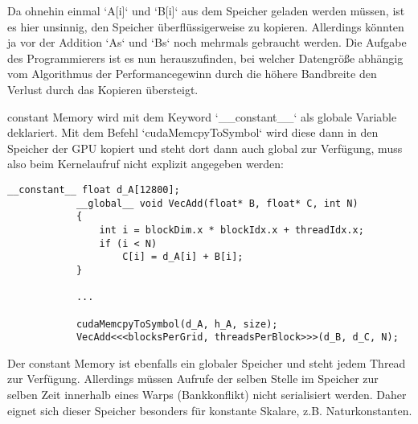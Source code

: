 		Da ohnehin einmal \li`A[i]` und \li`B[i]` aus dem Speicher geladen werden müssen, ist es hier unsinnig, den Speicher überflüssigerweise zu kopieren. Allerdings könnten ja vor der Addition \li`As` und \li`Bs` noch mehrmals gebraucht werden. Die Aufgabe des Programmierers ist es nun herauszufinden, bei welcher Datengröße abhängig vom Algorithmus der \Gls{Performance}gewinn durch die höhere Bandbreite den Verlust durch das Kopieren übersteigt.
		
		\Gls{constant Memory} wird mit dem Keyword \li`__constant__` als globale Variable deklariert. Mit dem Befehl \li`cudaMemcpyToSymbol` wird diese dann in den Speicher der GPU kopiert und steht dort dann auch global zur Verfügung, muss also beim \Gls{Kernel}aufruf nicht explizit angegeben werden:
		\begin{lstlisting}[caption=~Vektoraddition constant Memory]
			__constant__ float d_A[12800];
			__global__ void VecAdd(float* B, float* C, int N)
			{
    			int i = blockDim.x * blockIdx.x + threadIdx.x;
    			if (i < N)
        			C[i] = d_A[i] + B[i];
			}
			
			...
			
			cudaMemcpyToSymbol(d_A, h_A, size);
			VecAdd<<<blocksPerGrid, threadsPerBlock>>>(d_B, d_C, N);
		\end{lstlisting}
		
		Der \gls{constant Memory} ist ebenfalls ein globaler Speicher und steht jedem \Gls{Thread} zur Verfügung. Allerdings müssen Aufrufe der selben Stelle im Speicher zur selben Zeit innerhalb eines \Glspl{Warp} (Bankkonflikt) nicht serialisiert werden. Daher eignet sich dieser Speicher besonders für konstante Skalare, z.B. Naturkonstanten.
		

